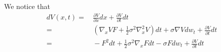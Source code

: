 \documentclass[aip,jcp,preprint,unsortedaddress,a4paper,onecolumn]{revtex4-1}
\begin{document}
We notice that
\begin{align}\nonumber
  dV(x, t) = &\, \frac{\partial V}{\partial x} dx + \frac{\partial V}{\partial t} dt\\\nonumber
  =&\,
  (\nabla_x V F + \frac12 \sigma^2 \nabla^2_x V) dt + \sigma \nabla V dw_t + \frac{\partial V}{\partial t} dt \\\nonumber
  =&\,
  -F^2dt + \frac12 \sigma^2\nabla_x F dt - \sigma F dw_t + \frac{\partial V}{\partial t} dt 
\end{align}


{}

\end{document}
